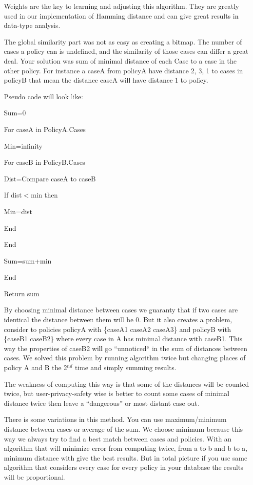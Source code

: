 \documentclass{article}
\begin{document}
\noindent Weights are the key to learning and adjusting this algorithm. They are greatly used in our implementation of Hamming distance and can give great results in data-type analysis.

\noindent 

\noindent The global similarity part was not as easy as creating a bitmap. The number of cases a policy can is undefined, and the similarity of those cases can differ a great deal. Your solution was sum of minimal distance of each Case to a case in the other policy. For instance a caseA from policyA have distance 2, 3, 1 to cases in policyB that mean the distance caseA will have distance 1 to policy. 

\noindent 

\noindent 

\noindent Pseudo code will look like:

\noindent Sum=0

\noindent For caseA in PolicyA.Cases

 Min=infinity

 For caseB in PolicyB.Cases

  Dist=Compare caseA to caseB

  If dist$<$min then

   Min=dist

  End

 End

 Sum=sum+min

\noindent End

\noindent Return sum

\noindent 

\noindent By choosing minimal distance between cases we guaranty that if two cases are identical the distance between them will be 0. But it also creates a problem, consider to policies policyA with \{caseA1 caseA2 caseA3\} and policyB with \{caseB1 caseB2\} where every case in A has minimal distance with caseB1. This way the properties of caseB2 will go ``unnoticed`` in the sum of distances between cases. We solved this problem by running algorithm twice but changing places of policy A and B the 2${}^{nd}$ time and simply summing results.

\noindent 

\noindent The weakness of computing this way is that some of the distances will be counted twice, but user-privacy-safety wise is better to count some cases of minimal distance twice then leave a ``dangerous'' or most distant case out.

\noindent 

\noindent There is some variations in this method. You can use maximum/minimum distance between cases or average of the sum. We choose minimum because this way we always try to find a best match between cases and policies. With an algorithm that will minimize error from computing twice, from a to b and b to a, minimum distance with give the best results. But in total picture if you use same algorithm that considers every case for every policy in your database the results will be proportional.
\end{document}
